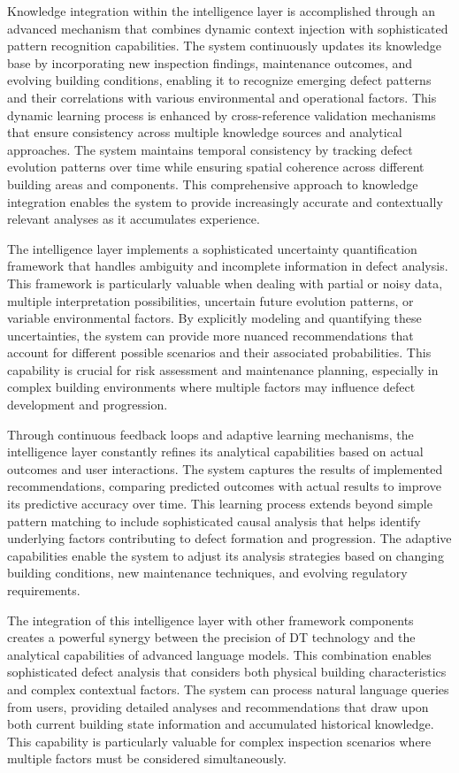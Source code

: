 \documentclass[a4paper,fleqn]{cas-sc}
\begin{document}
Knowledge integration within the intelligence layer is accomplished through an advanced mechanism that combines dynamic context injection with sophisticated pattern recognition capabilities. The system continuously updates its knowledge base by incorporating new inspection findings, maintenance outcomes, and evolving building conditions, enabling it to recognize emerging defect patterns and their correlations with various environmental and operational factors. This dynamic learning process is enhanced by cross-reference validation mechanisms that ensure consistency across multiple knowledge sources and analytical approaches. The system maintains temporal consistency by tracking defect evolution patterns over time while ensuring spatial coherence across different building areas and components. This comprehensive approach to knowledge integration enables the system to provide increasingly accurate and contextually relevant analyses as it accumulates experience.

The intelligence layer implements a sophisticated uncertainty quantification framework that handles ambiguity and incomplete information in defect analysis. This framework is particularly valuable when dealing with partial or noisy data, multiple interpretation possibilities, uncertain future evolution patterns, or variable environmental factors. By explicitly modeling and quantifying these uncertainties, the system can provide more nuanced recommendations that account for different possible scenarios and their associated probabilities. This capability is crucial for risk assessment and maintenance planning, especially in complex building environments where multiple factors may influence defect development and progression.

Through continuous feedback loops and adaptive learning mechanisms, the intelligence layer constantly refines its analytical capabilities based on actual outcomes and user interactions. The system captures the results of implemented recommendations, comparing predicted outcomes with actual results to improve its predictive accuracy over time. This learning process extends beyond simple pattern matching to include sophisticated causal analysis that helps identify underlying factors contributing to defect formation and progression. The adaptive capabilities enable the system to adjust its analysis strategies based on changing building conditions, new maintenance techniques, and evolving regulatory requirements.

The integration of this intelligence layer with other framework components creates a powerful synergy between the precision of DT technology and the analytical capabilities of advanced language models. This combination enables sophisticated defect analysis that considers both physical building characteristics and complex contextual factors. The system can process natural language queries from users, providing detailed analyses and recommendations that draw upon both current building state information and accumulated historical knowledge. This capability is particularly valuable for complex inspection scenarios where multiple factors must be considered simultaneously.
\end{document}
